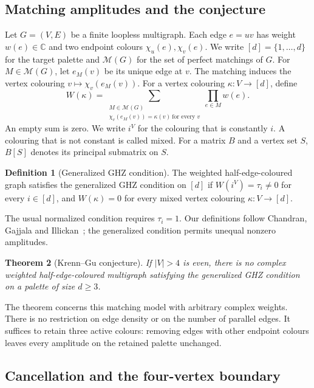 \documentclass[11pt]{article}
\newtheorem{theorem}{Theorem}[section]
\theoremstyle{definition}
\newtheorem{definition}[theorem]{Definition}
\theoremstyle{plain}
\numberwithin{equation}{section}
\begin{document}
\subsection{Matching amplitudes and the conjecture}\label{sec:graphmodel}

Let \(G=(V,E)\) be a finite loopless multigraph. Each edge \(e=uv\) has
weight \(w(e)\in\mathbb C\) and two endpoint colours \(\chi_u(e),\chi_v(e)\).
We write \([d]=\{1,\ldots,d\}\) for the target palette and
\(\mathcal M(G)\) for the set of perfect matchings of \(G\).
For \(M\in\mathcal M(G)\), let \(e_M(v)\) be its unique edge at \(v\).
The matching induces the vertex colouring
\(v\mapsto\chi_v(e_M(v))\). For a vertex colouring \(\kappa:V\to[d]\), define
\[
 W(\kappa)=
 \sum_{\substack{M\in\mathcal M(G)\\
       \chi_v(e_M(v))=\kappa(v)\ \text{for every }v}}
       \prod_{e\in M}w(e).
\]
An empty sum is zero. We write \(i^V\) for the colouring that is constantly
\(i\). A colouring that is not constant is called mixed. For a matrix \(B\)
and a vertex set \(S\), \(B[S]\) denotes its principal submatrix on \(S\).

\begin{definition}[Generalized GHZ condition]\label{def:ghz}
The weighted half-edge-coloured graph satisfies the generalized GHZ condition
on \([d]\) if \(W(i^V)=\tau_i\ne0\) for every \(i\in[d]\), and
\(W(\kappa)=0\) for every mixed vertex colouring \(\kappa:V\to[d]\).
\end{definition}

The usual normalized condition requires \(\tau_i=1\). Our definitions follow
Chandran, Gajjala and Illickan~\cite[Sections~1.1 and~1.4]{cgi}; the
generalized condition permits unequal nonzero amplitudes.

\begin{theorem}[Krenn--Gu conjecture]\label{thm:graphmain}
If \(|V|>4\) is even, there is no complex weighted half-edge-coloured
multigraph satisfying the generalized GHZ condition on a palette of size
\(d\ge3\).
\end{theorem}

The theorem concerns this matching model with arbitrary complex weights.
There is no restriction on edge density or on the number of parallel edges.
It suffices to retain three active colours: removing edges with other
endpoint colours leaves every amplitude on the retained palette unchanged.

\subsection{Cancellation and the four-vertex boundary}
\end{document}
